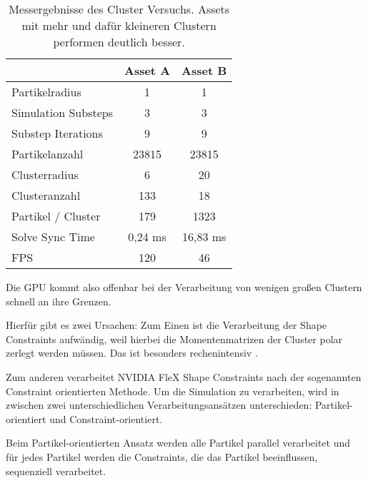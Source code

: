 \begin{table}[hbt!]
\centering
\caption{Messergebnisse des Cluster Versuchs. Assets mit mehr und dafür kleineren Clustern performen deutlich besser.}
\label{table_clusters}
\begin{tabular}{lcc}
                                         & \textbf{Asset A}      & \textbf{Asset B}      \\ \hline
\multicolumn{1}{l|}{Partikelradius}      & 1                     & 1                     \\
\multicolumn{1}{l|}{Simulation Substeps} & 3                     & 3                     \\
\multicolumn{1}{l|}{Substep Iterations}  & 9 					 & 9 				     \\
\multicolumn{1}{l|}{Partikelanzahl}      & 23815                 & 23815                 \\
\multicolumn{1}{l|}{Clusterradius}       & 6                     & 20                    \\
\multicolumn{1}{l|}{Clusteranzahl}       & 133                   & 18                    \\
\multicolumn{1}{l|}{Partikel / Cluster}  & 179                   & 1323                  \\ \hline
\multicolumn{1}{l|}{Solve Sync Time}     & 0,24 ms               & 16,83 ms              \\
\multicolumn{1}{l|}{FPS}                 & 120                   & 46   
\end{tabular}
\end{table}

Die GPU kommt also offenbar bei der Verarbeitung von wenigen großen Clustern schnell an ihre Grenzen.

Hierfür gibt es zwei Ursachen: Zum Einen ist die Verarbeitung der Shape Constraints aufwändig, weil hierbei die Momentenmatrizen der Cluster polar zerlegt werden müssen. Das ist besonders rechenintensiv \cite{FlexD3D}.

Zum anderen verarbeitet NVIDIA FleX Shape Constraints nach der sogenannten Constraint orientierten Methode. Um die Simulation zu verarbeiten, wird in \newline \cite{UPP} zwischen zwei unterschiedlichen Verarbeitungsansätzen unterschieden: Partikel-orientiert und Constraint-orientiert. 

Beim Partikel-orientierten Ansatz werden alle Partikel parallel verarbeitet und für jedes Partikel werden die Constraints, die das Partikel beeinflussen, sequenziell verarbeitet. 

